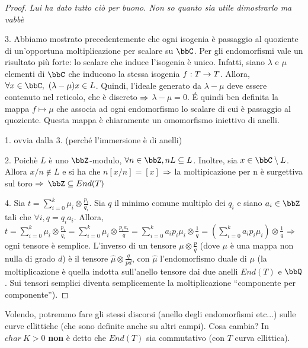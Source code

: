     \begin{proof} {\it Lui ha dato tutto ciò per buono. Non so quanto sia utile dimostrarlo ma vabbè}

    3. Abbiamo mostrato precedentemente che ogni isogenia è passaggio al quoziente di un'opportuna moltiplicazione per scalare su $\bbC$. Per gli endomorfismi vale un risultato più forte: lo scalare che induce l'isogenia è unico.
    Infatti, siano $\lambda$ e $\mu$ elementi di $\bbC$ che inducono la stessa isogenia $f:T\rightarrow T$. Allora, $\forall x\in \bbC,  \ (\lambda - \mu)x \in L$. Quindi, l'ideale generato da $\lambda -\mu$ deve essere contenuto nel reticolo, che è discreto $\Rightarrow$ $\lambda - \mu = 0$. \'E quindi ben definita la mappa $f \mapsto \mu$ che associa ad ogni endomorfismo lo scalare di cui è passaggio al quoziente. Questa mappa è chiaramente un omomorfismo iniettivo di anelli.

    1. ovvia dalla 3. (perché l'immersione è di anelli)

    2. Poichè $L$ è uno $\bbZ$-modulo, $\forall n \in \bbZ, nL\subseteq L$. Inoltre, sia $x\in \bbC \setminus L$. Allora $x/n \not\in L$ e si ha che $n[x/n]=[x]$ $\Rightarrow$ la moltipicazione per n è surgettiva sul toro $\Rightarrow$ $\bbZ \subseteq End(T)$

    4. Sia $t=\sum\limits_{i=0}^{k} \mu_{i} \otimes \frac{p_{i}}{q_{i}}$. Sia $q$ il minimo comune multiplo dei $q_{i}$ e siano $a_{i} \in \bbZ$ tali che $\forall i, q=q_{i}a_{i}$. Allora,\\
    $t=\sum\limits_{i=0}^{k} \mu_{i}\otimes \frac{p_{i}}{q_{i}} = \sum\limits_{i=0}^{k} \mu_{i} \otimes \frac{p_{i}a_{i}}{q}= \sum\limits_{i=0}^{k} a_{i}p_{i}\mu_{i}\otimes \frac{1}{q} = (\sum\limits_{i=0}^{k} a_{i}p_{i}\mu_{i})\otimes \frac{1}{q}$ $\Rightarrow$ ogni tensore è semplice. L'inverso di un tensore $\mu \otimes \frac{p}{q}$ (dove $\mu$ è una mappa non nulla di grado $d$) è il tensore $\hat{\mu} \otimes \frac{q}{pd}$, con $\hat{\mu}$ l'endomorfismo duale di $\mu$ (la moltiplicazione è quella indotta sull'anello tensore dai due anelli $End(T)$ e $\bbQ$. Sui tensori semplici diventa semplicemente la moltiplicazione ``componente per componente'').
    \end{proof}

    Volendo, potremmo fare gli stessi discorsi (anello degli endomorfismi etc...) sulle curve ellittiche (che sono definite anche su altri campi). Cosa cambia? In $char \ K >0$ {\bf non } è detto che $End(T)$ sia commutativo (con $T$ curva ellittica).

